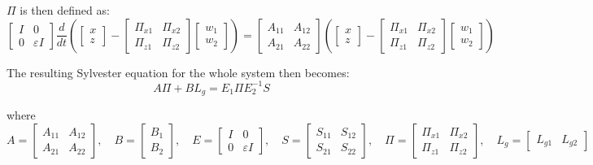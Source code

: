 \documentclass{article}
\begin{document}
$\Pi$ is then defined as: 
\begin{equation}
\begin{bmatrix}
  I & 0 \\
  0 & \varepsilon I
\end{bmatrix}
\frac{d}{dt}
\left(
\begin{bmatrix}
  x \\
  z
\end{bmatrix}
-
\begin{bmatrix}
  \Pi_{x1} & \Pi_{x2} \\
  \Pi_{z1} & \Pi_{z2}
\end{bmatrix}
\begin{bmatrix}
  w_1 \\
  w_2
\end{bmatrix}
\right)
=
\begin{bmatrix} 
  A_{11} & A_{12} \\
  A_{21} & A_{22}
\end{bmatrix}
\left(
\begin{bmatrix}
  x \\
  z
\end{bmatrix}
-
\begin{bmatrix}
  \Pi_{x1} & \Pi_{x2} \\
  \Pi_{z1} & \Pi_{z2}
\end{bmatrix}
\begin{bmatrix}
  w_1 \\
  w_2
\end{bmatrix}
\right)
\end{equation}



The resulting Sylvester equation for the whole system then becomes: 
\begin{equation}
  A \Pi + B L_g = E_1 \Pi E_2^{-1} S
\end{equation}

where
\begin{equation}
A = \begin{bmatrix}
A_{11} & A_{12} \\  
A_{21} & A_{22}
\end{bmatrix}, \quad
B = \begin{bmatrix}
B_1 \\
B_2
\end{bmatrix}, \quad
E = \begin{bmatrix}
I & 0 \\
0 & \varepsilon I
\end{bmatrix}, \quad
S = \begin{bmatrix}
S_{11} & S_{12} \\
S_{21} & S_{22}
\end{bmatrix}, \quad
\Pi = \begin{bmatrix}
\Pi_{x1} & \Pi_{x2} \\ 
\Pi_{z1} & \Pi_{z2}
\end{bmatrix}, \quad
L_g = \begin{bmatrix}
L_{g1} & L_{g2}
\end{bmatrix}
\end{equation}
\end{document}
